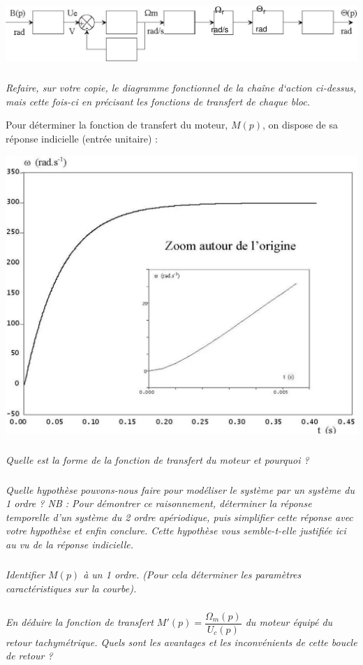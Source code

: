 \documentclass[11pt,oneside]{article}
\begin{document}
\begin{center}
 \includegraphics[width=.6\textwidth]{png/image4}
\end{center}

\subparagraph{}
\textit{Refaire, sur votre copie, le diagramme fonctionnel de la chaîne d‘action
ci-dessus, mais cette fois-ci en précisant les fonctions de transfert de chaque
bloc.}

Pour déterminer la fonction de transfert du moteur, $M(p)$, on dispose de sa
réponse indicielle (entrée unitaire) :

\begin{center}
 \includegraphics[width=.6\textwidth]{png/image5}
\end{center}

\subparagraph{}
\textit{Quelle est la forme de la fonction de transfert du moteur et pourquoi ?}

\subparagraph{}
\textit{Quelle hypothèse pouvons-nous faire pour modéliser le système par un
système du 1
ordre ?
NB : Pour démontrer ce raisonnement, déterminer la réponse temporelle d’un
système
du 2 ordre apériodique, puis simplifier cette réponse avec votre
hypothèse et enfin
conclure.
Cette hypothèse vous semble-t-elle justifiée ici au vu de la réponse indicielle.
}

\subparagraph{}
\textit{Identifier $M(p)$ à un 1 ordre. (Pour cela déterminer les
paramètres caractéristiques sur la courbe).}

\subparagraph{}
\textit{En déduire la fonction de transfert $M'(p)=\dfrac{\Omega_m(p)}{U_c(p)}$
du moteur équipé du retour                                                 
tachymétrique. Quels sont les avantages et les inconvénients de cette boucle de
retour ?}
\end{document}
